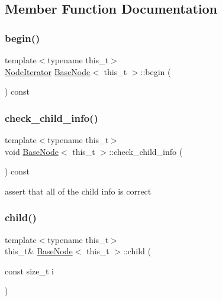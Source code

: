 \subsection{Member Function Documentation}
\mbox{\label{class_base_node_ac735dd6fe296af4b8d2951cc6d9052c8}} 
\subsubsection{\texorpdfstring{begin()}{begin()}}
{\footnotesize\ttfamily template$<$typename this\+\_\+t$>$ \\
\hyperlink{class_base_node_1_1_node_iterator}{Node\+Iterator} \hyperlink{class_base_node}{Base\+Node}$<$ this\+\_\+t $>$\+::begin (\begin{DoxyParamCaption}{ }\end{DoxyParamCaption}) const\hspace{0.3cm}{\ttfamily [inline]}}

\mbox{\label{class_base_node_a83b33d8a8902819b4175b66fb6e4b08e}} 
\subsubsection{\texorpdfstring{check\+\_\+child\+\_\+info()}{check\_child\_info()}}
{\footnotesize\ttfamily template$<$typename this\+\_\+t$>$ \\
void \hyperlink{class_base_node}{Base\+Node}$<$ this\+\_\+t $>$\+::check\+\_\+child\+\_\+info (\begin{DoxyParamCaption}{ }\end{DoxyParamCaption}) const\hspace{0.3cm}{\ttfamily [inline]}}

assert that all of the child info is correct\mbox{\label{class_base_node_ac2ed3b362a2563e86063a157daa1c288}} 
\subsubsection{\texorpdfstring{child()}{child()}\hspace{0.1cm}{\footnotesize\ttfamily [1/2]}}
{\footnotesize\ttfamily template$<$typename this\+\_\+t$>$ \\
this\+\_\+t\& \hyperlink{class_base_node}{Base\+Node}$<$ this\+\_\+t $>$\+::child (\begin{DoxyParamCaption}\item[{const size\+\_\+t}]{i }\end{DoxyParamCaption})\hspace{0.3cm}{\ttfamily [inline]}}

